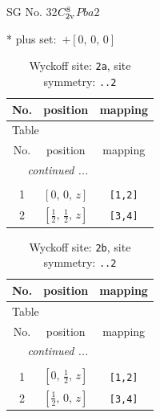 \documentclass[fleqn,8pt]{jsarticle}
\begin{document}
\setcounter{MaxMatrixCols}{32}

\renewcommand{\tablename}{Table~}
\renewcommand{\figurename}{Figure~}
\begin{center}
\LARGE
SG No. 32\quad$C_{\rm 2v}^{8}$\quad$Pba2$\quad[ orthorhombic ]
\end{center}
* plus set:\,\,\,$+\left[ 0,\, 0,\, 0 \right]$
\renewcommand{\arraystretch}{1.2}
\begin{longtable}{ccc}
\caption{Wyckoff site: {\tt 2a}, site symmetry: {\tt ..2}}
 \\
 \hline \hline
No. & position & mapping \\ \hline \endfirsthead

\multicolumn{2}{l}{\tablename\ \thetable{}} \\
 \hline \hline
No. & position & mapping \\ \hline \endhead

 \hline \hline
\multicolumn{2}{r}{\footnotesize\it continued ...} \\ \endfoot

 \hline \hline
\multicolumn{2}{r}{} \\ \endlastfoot

1 & $\left[ 0,\, 0,\, z \right]$ & {\tt [1,2]} \\ \hline
2 & $\left[ \frac{1}{2},\, \frac{1}{2},\, z \right]$ & {\tt [3,4]} \\
\end{longtable}
\renewcommand{\arraystretch}{1.2}
\begin{longtable}{ccc}
\caption{Wyckoff site: {\tt 2b}, site symmetry: {\tt ..2}}
 \\
 \hline \hline
No. & position & mapping \\ \hline \endfirsthead

\multicolumn{2}{l}{\tablename\ \thetable{}} \\
 \hline \hline
No. & position & mapping \\ \hline \endhead

 \hline \hline
\multicolumn{2}{r}{\footnotesize\it continued ...} \\ \endfoot

 \hline \hline
\multicolumn{2}{r}{} \\ \endlastfoot

1 & $\left[ 0,\, \frac{1}{2},\, z \right]$ & {\tt [1,2]} \\ \hline
2 & $\left[ \frac{1}{2},\, 0,\, z \right]$ & {\tt [3,4]} \\
\end{longtable}
\end{document}
